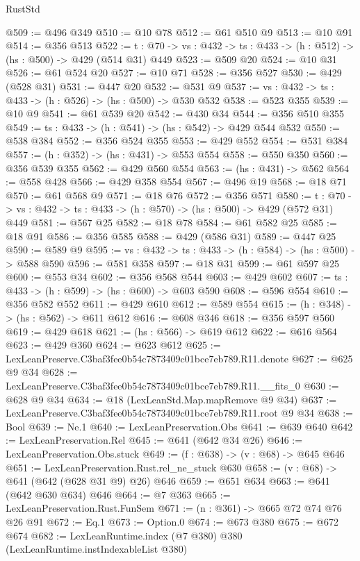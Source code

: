 \begin{lexlean}{RustStd}
\begin{coremodule}
@509 := @496 @349
@510 := @10 @78
@512 := @61 @510 @9
@513 := @10 @91
@514 := @356 @513
@522 := {t : @70} -> {vs : @432} -> {ts : @433} -> (h : @512) -> (hs : @500) -> @429 (@514 @31) @449
@523 := @509 @20
@524 := @10 @31
@526 := @61 @524 @20
@527 := @10 @71
@528 := @356 @527
@530 := @429 (@528 @31)
@531 := @447 @20
@532 := @531 @9
@537 := {vs : @432} -> {ts : @433} -> (h : @526) -> (hs : @500) -> @530 @532
@538 := @523 @355
@539 := @10 @9
@541 := @61 @539 @20
@542 := @430 @34
@544 := @356 @510 @355
@549 := {ts : @433} -> (h : @541) -> (hs : @542) -> @429 @544 @532
@550 := @538 @384
@552 := @356 @524 @355
@553 := @429 @552
@554 := @531 @384
@557 := (h : @352) -> (hs : @431) -> @553 @554
@558 := @550 @350
@560 := @356 @539 @355
@562 := @429 @560 @554
@563 := (hs : @431) -> @562
@564 := @558 @428
@566 := @429 @358 @554
@567 := @496 @19
@568 := @18 @71
@570 := @61 @568 @9
@571 := @18 @76
@572 := @356 @571
@580 := {t : @70} -> {vs : @432} -> {ts : @433} -> (h : @570) -> (hs : @500) -> @429 (@572 @31) @449
@581 := @567 @25
@582 := @18 @78
@584 := @61 @582 @25
@585 := @18 @91
@586 := @356 @585
@588 := @429 (@586 @31)
@589 := @447 @25
@590 := @589 @9
@595 := {vs : @432} -> {ts : @433} -> (h : @584) -> (hs : @500) -> @588 @590
@596 := @581 @358
@597 := @18 @31
@599 := @61 @597 @25
@600 := @553 @34
@602 := @356 @568 @544
@603 := @429 @602
@607 := {ts : @433} -> (h : @599) -> (hs : @600) -> @603 @590
@608 := @596 @554
@610 := @356 @582 @552
@611 := @429 @610
@612 := @589 @554
@615 := (h : @348) -> (hs : @562) -> @611 @612
@616 := @608 @346
@618 := @356 @597 @560
@619 := @429 @618
@621 := (hs : @566) -> @619 @612
@622 := @616 @564
@623 := @429 @360
@624 := @623 @612
@625 := LexLeanPreserve.C3baf3fee0b54c7873409c01bce7eb789.R11.denote
@627 := @625 @9 @34
@628 := LexLeanPreserve.C3baf3fee0b54c7873409c01bce7eb789.R11.__fits_0
@630 := @628 @9 @34
@634 := @18 (LexLeanStd.Map.mapRemove @9 @34)
@637 := LexLeanPreserve.C3baf3fee0b54c7873409c01bce7eb789.R11.root @9 @34
@638 := Bool
@639 := Ne.{1}
@640 := LexLeanPreservation.Obs
@641 := @639 @640
@642 := LexLeanPreservation.Rel
@645 := @641 (@642 @34 @26)
@646 := LexLeanPreservation.Obs.stuck
@649 := (f : @638) -> (v : @68) -> @645 @646
@651 := LexLeanPreservation.Rust.rel_ne_stuck @630
@658 := (v : @68) -> @641 (@642 (@628 @31 @9) @26) @646
@659 := @651 @634
@663 := @641 (@642 @630 @634) @646
@664 := @7 @363
@665 := LexLeanPreservation.Rust.FunSem
@671 := (n : @361) -> @665 @72 @74 @76 @26 @91
@672 := Eq.{1}
@673 := Option.{0}
@674 := @673 @380
@675 := @672 @674
@682 := LexLeanRuntime.index (@7 @380) @380 (LexLeanRuntime.instIndexableList @380)

\end{coremodule}
\end{lexlean}
